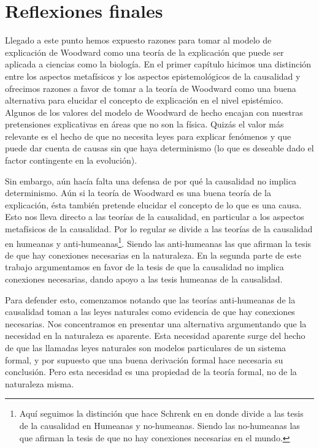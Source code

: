 
\chapter*{Reflexiones finales}

\noindent Llegado a este punto hemos expuesto razones para tomar al modelo de explicación de Woodward como una teoría de la explicación que puede ser aplicada a ciencias como la biología. En el primer capítulo hicimos una distinción entre los aspectos metafísicos y los aspectos epistemológicos de la causalidad y ofrecimos razones a favor de tomar a la teoría de Woodward como una buena alternativa para elucidar el concepto de explicación en el nivel epistémico. Algunos de los valores del modelo de Woodward de hecho encajan con nuestras pretensiones explicativas en áreas que no son la física. Quizás el valor más relevante es el hecho de que no necesita leyes para explicar fenómenos y que puede dar cuenta de causas sin que haya determinismo (lo que es deseable dado el factor contingente en la evolución).

Sin embargo, aún hacía falta una defensa de por qué la causalidad no implica determinismo. Aún si la teoría de Woodward es una buena teoría de la explicación, ésta también pretende elucidar el concepto de lo que es una causa. Esto nos lleva directo a las teorías de la causalidad, en particular a los aspectos metafísicos de la causalidad. Por lo regular se divide a las teorías de la causalidad en humeanas y anti-humeanas\footnote{Aquí seguimos la distinción que hace Schrenk en \citeyear{Schrenk2017} en donde divide a las tesis de la causalidad en Humeanas y no-humeanas. Siendo las no-humeanas las que afirman la tesis de que no hay conexiones necesarias en el mundo.}. Siendo las anti-humeanas las que afirman la tesis de que hay conexiones necesarias en la naturaleza. En la segunda parte de este trabajo argumentamos en favor de la tesis de que la causalidad no implica conexiones necesarias, dando apoyo a las tesis humeanas de la causalidad.

Para defender esto, comenzamos notando que las teorías anti-humeanas de la causalidad toman a las leyes naturales como evidencia de que hay conexiones necesarias. Nos concentramos en presentar una alternativa argumentando que la necesidad en la naturaleza es aparente. Esta necesidad aparente surge del hecho de que las llamadas leyes naturales son modelos particulares de un sistema formal, y por supuesto que una buena derivación formal hace necesaria su conclusión. Pero esta necesidad es una propiedad de la teoría formal, no de la naturaleza misma.

